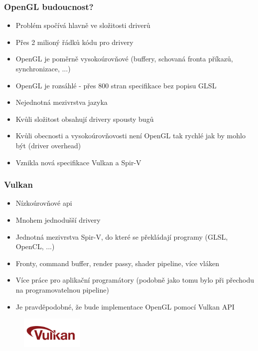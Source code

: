 \begin{frame}
\frametitle{OpenGL budoucnost?}
  \begin{itemize}
    \item Problém spočívá hlavně ve složitosti driverů
    \item Přes 2 milioný řádků kódu pro drivery
    \item OpenGL je poměrně vysokoúrovňové (buffery, schovaná fronta příkazů, synchronizace, ...)
    \item OpenGL je rozsáhlé - přes 800 stran specifikace bez popisu GLSL
    \item Nejednotná mezivrstva jazyka
    \item Kvůli složitost obsahují drivery spousty bugů
    \item Kvůli obecnosti a vysokoúrovňovosti není OpenGL tak rychlé jak by mohlo být (driver overhead)
    \item Vznikla nová specifikace Vulkan a Spir-V
  \end{itemize}
\end{frame}

\begin{frame}
\frametitle{Vulkan}
  \begin{itemize}
    \item Nízkoúrovňové api
    \item Mnohem jednodušší drivery
    \item Jednotná mezivrstva Spir-V, do které se překládají programy (GLSL, OpenCL, ...)
    \item Fronty, command buffer, render passy, shader pipeline, více vláken
    \item Více práce pro aplikační programátory (podobně jako tomu bylo při přechodu na programovatelnou pipeline)
    \item Je pravděpodobné, že bude implementace OpenGL pomocí Vulkan API
  \end{itemize}
	\begin{figure}[h]
	\includegraphics[width=3cm,keepaspectratio]{pics/vulkan}
	\end{figure}
\end{frame}


